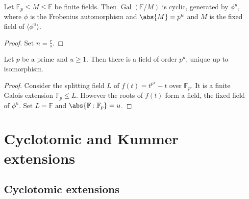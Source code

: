 \documentclass{article}
\DeclareMathOperator{\Gal}{Gal}
\newcommand{\F}{\mathbb{F}}
\begin{document}
\begin{ncor}\label{cor:3.17}
    Let $\F_p \leq M \leq \F$ be finite fields.
    Then $\Gal(\F/M)$ is cyclic, generated by $\phi^u$, where $\phi$ is the Frobenius automorphism and $\abs{M} = p^u$ and $M$ is the fixed field of $\langle \phi^u \rangle$.
\end{ncor}
\begin{proof}
    Set $n = \frac{r}{s}$.
\end{proof}
\begin{nthm}\label{thm:3.18}
    Let $p$ be a prime and $u \geq 1$.
    Then there is a field of order $p^u$, unique up to isomorphism.
\end{nthm}
\begin{proof}
    Consider the splitting field $L$ of $f(t) = t^{p^u} - t$ over $\F_p$.
    It is a finite Galois extension $\F_p \leq L$.
    However the roots of $f(t)$ form a field, the fixed field of $\phi^u$.
    Set $L = \F$ and $\abs{\F :\F_p} = u$.
\end{proof}

\clearpage
\section{Cyclotomic and Kummer extensions}
\subsection{Cyclotomic extensions}




























\end{document}
